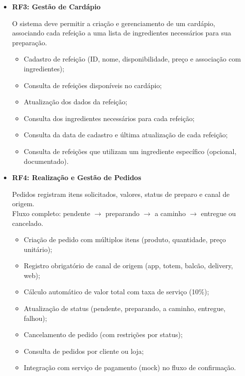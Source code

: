 \begin{itemize}
  \item \textbf{RF3: Gestão de Cardápio}

  O sistema deve permitir a criação e gerenciamento de um cardápio, associando cada refeição a uma lista de ingredientes necessários para sua preparação.

  \begin{itemize}[topsep=0pt, itemsep=0pt]
    \item Cadastro de refeição (ID, nome, disponibilidade, preço e associação com ingredientes);
    \item Consulta de refeições disponíveis no cardápio;
    \item Atualização dos dados da refeição;
    \item Consulta dos ingredientes necessários para cada refeição;
    \item Consulta da data de cadastro e última atualização de cada refeição;
    \item Consulta de refeições que utilizam um ingrediente específico (opcional, documentado).
  \end{itemize}
\end{itemize}

\begin{itemize}
  \item \textbf{RF4: Realização e Gestão de Pedidos}

  Pedidos registram itens solicitados, valores, status de preparo e canal de origem. \\
  Fluxo completo: pendente $\rightarrow$ preparando $\rightarrow$ a caminho $\rightarrow$ entregue ou cancelado.

  \begin{itemize}[topsep=0pt, itemsep=0pt]
    \item Criação de pedido com múltiplos itens (produto, quantidade, preço unitário);
    \item Registro obrigatório de canal de origem (app, totem, balcão, delivery, web);
    \item Cálculo automático de valor total com taxa de serviço (10\%);
    \item Atualização de status (pendente, preparando, a caminho, entregue, falhou);
    \item Cancelamento de pedido (com restrições por status);
    \item Consulta de pedidos por cliente ou loja;
    \item Integração com serviço de pagamento (mock) no fluxo de confirmação.
  \end{itemize}
\end{itemize}

